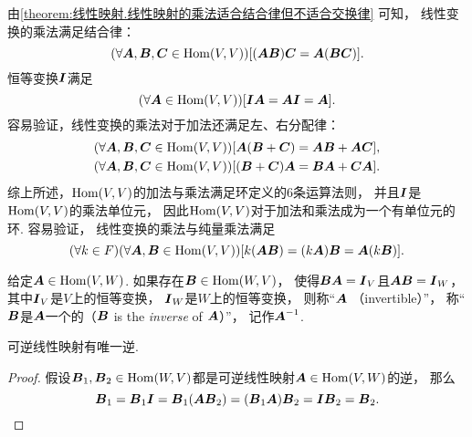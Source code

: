 由\cref{theorem:线性映射.线性映射的乘法适合结合律但不适合交换律} 可知，
线性变换的乘法满足结合律：\begin{equation*}
	(\forall\vb{A},\vb{B},\vb{C}\in\Hom(V,V))
	[
		(\vb{A}\vb{B})\vb{C}
		= \vb{A}(\vb{B}\vb{C})
	].
\end{equation*}
恒等变换\(\vb{I}\)满足\begin{equation*}
	(\forall\vb{A}\in\Hom(V,V))
	[\vb{I}\vb{A}=\vb{A}\vb{I}=\vb{A}].
\end{equation*}
容易验证，线性变换的乘法对于加法还满足左、右分配律：\begin{gather*}
	(\forall\vb{A},\vb{B},\vb{C}\in\Hom(V,V))
	[\vb{A}(\vb{B}+\vb{C})=\vb{A}\vb{B}+\vb{A}\vb{C}], \\
	(\forall\vb{A},\vb{B},\vb{C}\in\Hom(V,V))
	[(\vb{B}+\vb{C})\vb{A}=\vb{B}\vb{A}+\vb{C}\vb{A}].
\end{gather*}
综上所述，\(\Hom(V,V)\)的加法与乘法满足环定义的6条运算法则，
并且\(\vb{I}\)是\(\Hom(V,V)\)的乘法单位元，
因此\(\Hom(V,V)\)对于加法和乘法成为一个有单位元的环.
容易验证，
线性变换的乘法与纯量乘法满足\begin{equation*}
	(\forall k\in F)
	(\forall\vb{A},\vb{B}\in\Hom(V,V))
	[
		k(\vb{A}\vb{B})
		=(k\vb{A})\vb{B}
		=\vb{A}(k\vb{B})
	].
\end{equation*}

\begin{definition}
给定\(\vb{A}\in\Hom(V,W)\).
如果存在\(\vb{B}\in\Hom(W,V)\)，
使得\(\vb{B}\vb{A}=\vb{I}_V\)且\(\vb{A}\vb{B}=\vb{I}_W\)，
其中\(\vb{I}_V\)是\(V\)上的恒等变换，
\(\vb{I}_W\)是\(W\)上的恒等变换，
则称“\(\vb{A}\) （invertible）”，
称“\(\vb{B}\)是\(\vb{A}\)一个的（\(\vb{B}\) is the \emph{inverse} of \(\vb{A}\)）”，
记作\(\vb{A}^{-1}\).
\end{definition}
\begin{proposition}\label{theorem:线性映射.可逆线性映射有唯一逆}
可逆线性映射有唯一逆.
\begin{proof}
假设\(\vb{B}_1,\vb{B}_2\in\Hom(W,V)\)都是可逆线性映射\(\vb{A}\in\Hom(V,W)\)的逆，
那么\begin{equation*}
	\vb{B}_1 = \vb{B}_1 \vb{I}
	= \vb{B}_1 (\vb{A} \vb{B}_2)
	= (\vb{B}_1 \vb{A}) \vb{B}_2
	= \vb{I} \vb{B}_2
	= \vb{B}_2.
	\qedhere
\end{equation*}
\end{proof}
\end{proposition}

